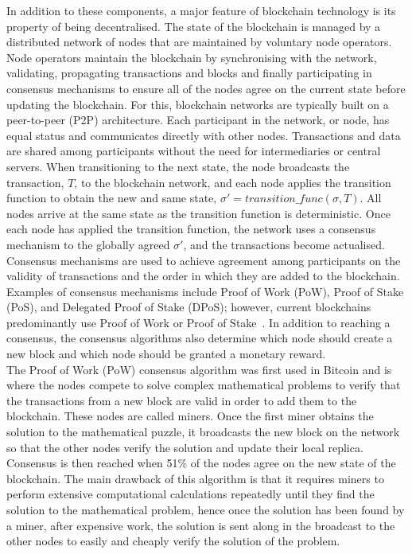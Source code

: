 \noindent In addition to these components, a major feature of blockchain technology is its property of being decentralised. The state of the blockchain is managed by a distributed network of nodes that are maintained by voluntary node operators. Node operators maintain the blockchain by synchronising with the network, validating, propagating transactions and blocks and finally participating in consensus mechanisms to ensure all of the nodes agree on the current state before updating the blockchain. For this, blockchain networks are typically built on a peer-to-peer (P2P) architecture. Each participant in the network, or node, has equal status and communicates directly with other nodes. Transactions and data are shared among participants without the need for intermediaries or central servers. When transitioning to the next state, the node broadcasts the transaction, $T$, to the blockchain network, and each node applies the transition function to obtain the new and same state, $\sigma' = transition\_func(\sigma, T)$. All nodes arrive at the same state as the transition function is deterministic. Once each node has applied the transition function, the network uses a consensus mechanism to the globally agreed $\sigma'$, and the transactions become actualised.
\\[3mm]
Consensus mechanisms are used to achieve agreement among participants on the validity of transactions and the order in which they are added to the blockchain. Examples of consensus mechanisms include Proof of Work (PoW), Proof of Stake (PoS), and Delegated Proof of Stake (DPoS); however, current blockchains predominantly use Proof of Work or Proof of Stake~\cite{noauthor_consensus_nodate}. In addition to reaching a consensus, the consensus algorithms also determine which node should create a new block and which node should be granted a monetary reward.
\\[3mm]
The Proof of Work (PoW) consensus algorithm was first used in Bitcoin and is where the nodes compete to solve complex mathematical problems to verify that the transactions from a new block are valid in order to add them to the blockchain. These nodes are called miners. Once the first miner obtains the solution to the mathematical puzzle, it broadcasts the new block on the network so that the other nodes verify the solution and update their local replica. Consensus is then reached when 51\% of the nodes agree on the new state of the blockchain. The main drawback of this algorithm is that it requires miners to perform extensive computational calculations repeatedly until they find the solution to the mathematical problem, hence once the solution has been found by a miner, after expensive work, the solution is sent along in the broadcast to the other nodes to easily and cheaply verify the solution of the problem.
